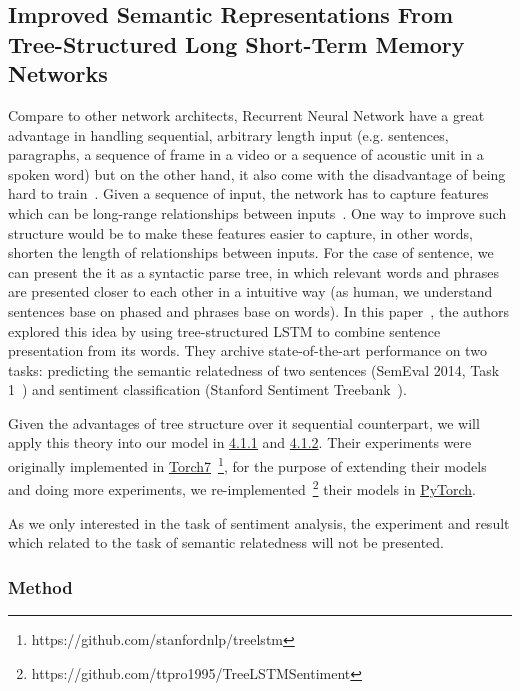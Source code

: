 \subsection{Improved Semantic Representations From Tree-Structured Long Short-Term Memory Networks}
Compare to other network architects, Recurrent Neural Network have a great advantage in handling sequential, arbitrary length input (e.g. sentences, paragraphs, a sequence of frame in a video or a sequence of acoustic unit in a spoken word) but on the other hand, it also come with the disadvantage of being hard to train~\cite{hardRNN}.
Given a sequence of input, the network has to capture features which can be long-range relationships between inputs~\cite{socher2013recursive}.
One way to improve such structure would be to make these features easier to capture, in other words, shorten the length of relationships between inputs.
For the case of sentence, we can present the it as a syntactic parse tree, in which relevant words and phrases are presented closer to each other in a intuitive way (as human, we understand sentences base on phased and phrases base on words). 
In this paper~\cite{treeLSTM}, the authors explored this idea by using tree-structured LSTM to combine sentence presentation from its words.
They archive state-of-the-art performance on two tasks: predicting the semantic relatedness of two sentences (SemEval 2014, Task 1~\cite{SemeEvalTask1}) and sentiment classification (Stanford Sentiment Treebank~\cite{socher2013recursive}).


Given the advantages of tree structure over it sequential counterpart, we will apply this theory into our model in \hyperref[sec:VTtree]{4.1.1} and \hyperref[sec:CNNtree]{4.1.2}. 
Their experiments were originally implemented in \hyperref[sec:torch]{Torch7}~\footnote{https://github.com/stanfordnlp/treelstm}, for the purpose of extending their models and doing more experiments, we re-implemented~\footnote{https://github.com/ttpro1995/TreeLSTMSentiment} their models in \hyperref[sec:pytorch]{PyTorch}. 

As we only interested in  the task of sentiment analysis, the experiment and result which related to the task of semantic relatedness will not be presented.

\subsubsection{Method}
